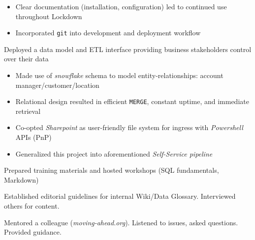 \documentclass[../cv.tex]{subfiles}
\begin{document}
\begin{description}[style=multiline, leftmargin=3.5cm]
\begin{itemize}
		     \item Clear documentation (installation, configuration) led to continued use throughout Lockdown
		     \item Incorporated \texttt{git} into development and deployment workflow
	      \end{itemize}
	\item[Sales Data Model\\ \textnormal{PL/SQL\\Powershell}]
		Deployed a data model and ETL interface providing business stakeholders control over their data
		  \begin{itemize}		     
			\item Made use of \textit{snowflake} schema to model entity-relationships: account manager/customer/location 
		    \item Relational design resulted in efficient \texttt{MERGE}, constant uptime, and immediate retrieval
		    \item Co-opted \textit{Sharepoint} as user-friendly file system for ingress with \textit{Powershell} APIs (PnP)
		    \item Generalized this project into aforementioned \textit{Self-Service pipeline}
	      \end{itemize}
	\item[Training] Prepared training materials and hosted workshops (SQL fundamentals, Markdown)
	\item[Data Glossary] Established editorial guidelines for internal Wiki/Data Glossary. Interviewed others for content.
	\item[Mentorship] Mentored a colleague (\textit{moving-ahead.org}). Listened to issues, asked questions. Provided guidance.
\end{description}
\end{document}
